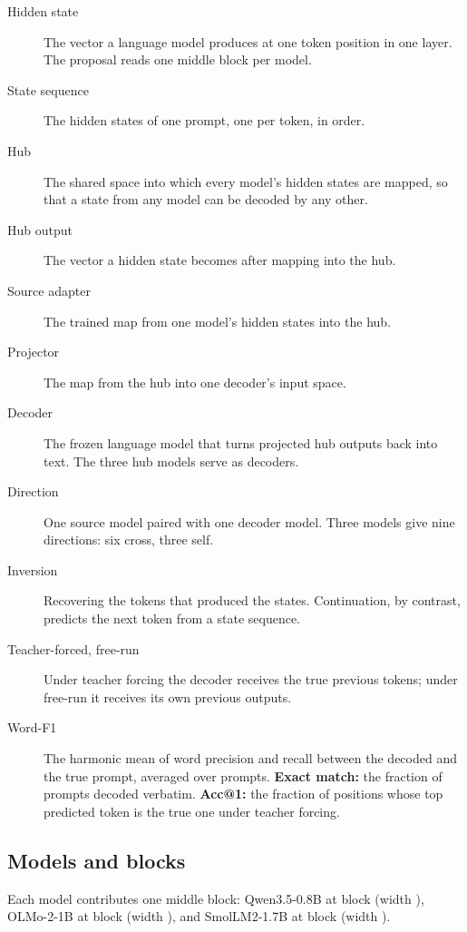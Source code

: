 \begin{description}
\item[Hidden state] The vector a language model produces at one token position in one layer. The proposal reads one middle block per model.
\item[State sequence] The hidden states of one prompt, one per token, in order.
\item[Hub] The shared space into which every model's hidden states are mapped, so that a state from any model can be decoded by any other.
\item[Hub output] The vector a hidden state becomes after mapping into the hub.
\item[Source adapter] The trained map from one model's hidden states into the hub.
\item[Projector] The map from the hub into one decoder's input space.
\item[Decoder] The frozen language model that turns projected hub outputs back into text. The three hub models serve as decoders.
\item[Direction] One source model paired with one decoder model. Three models give nine directions: six cross, three self.
\item[Inversion] Recovering the tokens that produced the states. Continuation, by contrast, predicts the next token from a state sequence.
\item[Teacher-forced, free-run] Under teacher forcing the decoder receives the true previous tokens; under free-run it receives its own previous outputs.
\item[Word-F1] The harmonic mean of word precision and recall between the decoded and the true prompt, averaged over prompts. \textbf{Exact match:} the fraction of prompts decoded verbatim. \textbf{Acc@1:} the fraction of positions whose top predicted token is the true one under teacher forcing.
\end{description}

\subsection{Models and blocks}

Each model contributes one middle block: Qwen3.5-0.8B at block  (width ), OLMo-2-1B at block  (width ), and SmolLM2-1.7B at block  (width ). %

